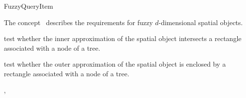 

\begin{ccRefConcept}{FuzzyQueryItem}


\ccDefinition
  
The concept \ccRefName\ describes the requirements for fuzzy $d$-dimensional spatial objects.

\ccTypes





\ccOperations


{test whether the inner approximation of the spatial object intersects a rectangle
associated with a node of a tree. }

{test whether the outer approximation of the spatial object is enclosed by a rectangle
associated with a node of a tree.}


\ccHasModels

,\\




\end{ccRefConcept}


